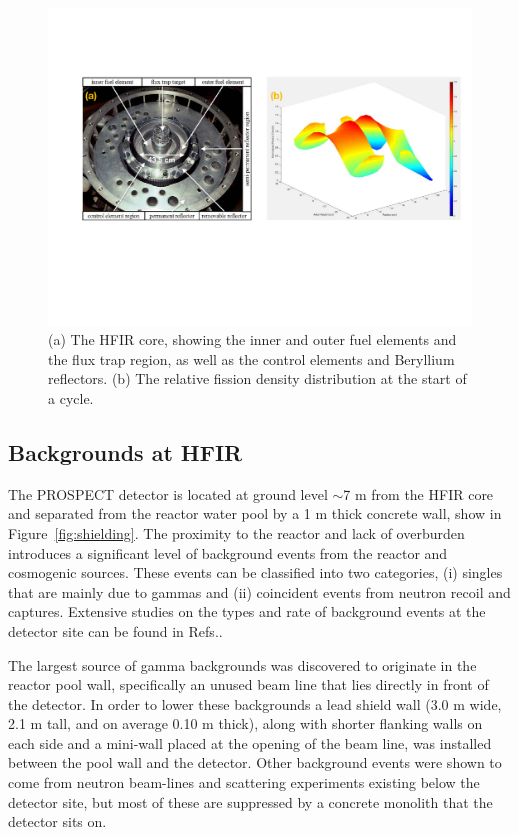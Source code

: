 \begin{figure}[t]
	\centering
	\includegraphics[width=0.9\linewidth]{tex/4-prospect-images/HFIR}
	\caption[The HFIR core and flux distribution]{(a) The HFIR core, showing the inner and outer fuel elements and the flux trap region, as well as the control elements and Beryllium reflectors. (b) The relative fission density distribution at the start of a cycle. \cite{HFIRTech}}
	\label{fig:hfir}
\end{figure}

\subsection{Backgrounds at HFIR}

The PROSPECT detector is located at ground level $\sim$7 m from the HFIR core and separated from the reactor water pool by a 1 m thick concrete wall, show in Figure~\ref{fig:shielding}.
The proximity to the reactor and lack of overburden introduces a significant level of background events from the reactor and cosmogenic sources. 
These events can be classified into two categories, (i) singles that are mainly due to gammas and (ii) coincident events from neutron recoil and captures. 
Extensive studies on the types and rate of background events at the detector site can be found in Refs.\cite{Ashenfelter:2015tpm,Heffron,Hackett}.

The largest source of gamma backgrounds was discovered to originate in the reactor pool wall, specifically an unused beam line that lies directly in front of the detector. 
In order to lower these backgrounds a lead shield wall (3.0 m wide, 2.1 m tall, and on average 0.10 m thick), along with shorter flanking walls on each side and a mini-wall placed at the opening of the beam line, was installed between the pool wall and the detector.
Other background events were shown to come from neutron beam-lines and scattering experiments existing below the detector site, but most of these are suppressed by a concrete monolith that the detector sits on.

